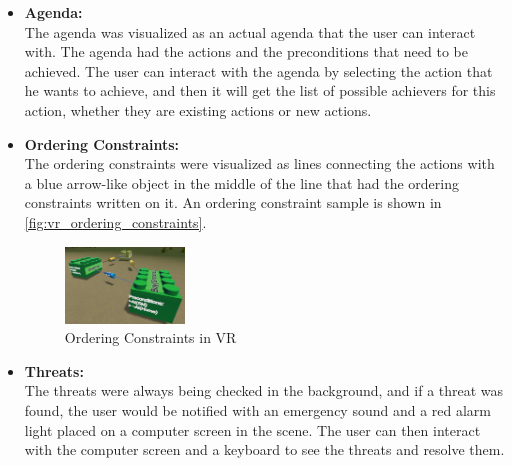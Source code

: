 \begin{itemize}
    \item \textbf{Agenda:} \\
          The agenda was visualized as an actual agenda that the user can interact with. The agenda had the actions and the preconditions that need to be achieved. The user can interact with the agenda by selecting the action that he wants to achieve, and then it will get the list of possible achievers for this action, whether they are existing actions or new actions.

    \item \textbf{Ordering Constraints:} \\
          The ordering constraints were visualized as lines connecting the actions with a blue arrow-like object in the middle of the line that had the ordering constraints written on it. An ordering constraint sample is shown in \autoref{fig:vr_ordering_constraints}.
          \begin{figure}[H]
              \centering
              \includegraphics[width=0.3\textwidth]{images/ordering_constraints.png}
              \caption[Ordering Constraints in VR]{Ordering Constraints in VR}
              \label{fig:vr_ordering_constraints}
          \end{figure}

    \item \textbf{Threats:} \\
          The threats were always being checked in the background, and if a threat was found, the user would be notified with an emergency sound and a red alarm\cite{3DAlarmLight} light placed on a computer screen in the scene. The user can then interact with the computer screen and a keyboard to see the threats and resolve them.


\end{itemize}
